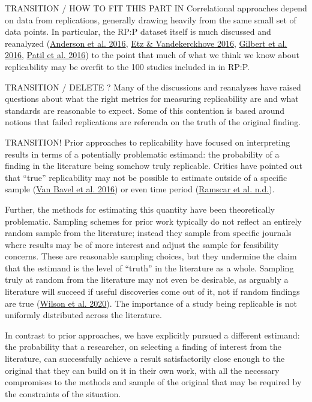\documentclass[
  english,
  a4paper,
]{article}
\begin{document}
TRANSITION / HOW TO FIT THIS PART IN Correlational approaches depend on data from replications, generally drawing heavily from the same small set of data points. In particular, the RP:P dataset itself is much discussed and reanalyzed (\protect\hyperlink{ref-anderson2016}{Anderson et al. 2016}, \protect\hyperlink{ref-etz2016}{Etz \& Vandekerckhove 2016}, \protect\hyperlink{ref-gilbert2016}{Gilbert et al. 2016}, \protect\hyperlink{ref-patil2016}{Patil et al. 2016}) to the point that much of what we think we know about replicability may be overfit to the 100 studies included in in RP:P.

TRANSITION / DELETE ? Many of the discussions and reanalyses have raised questions about what the right metrics for measuring replicability are and what standards are reasonable to expect. Some of this contention is based around notions that failed replications are referenda on the truth of the original finding.

TRANSITION! Prior approaches to replicability have focused on interpreting results in terms of a potentially problematic estimand: the probability of a finding in the literature being somehow truly replicable. Critics have pointed out that ``true'' replicability may not be possible to estimate outside of a specific sample (\protect\hyperlink{ref-vanbavel2016}{Van Bavel et al. 2016}) or even time period (\protect\hyperlink{ref-ramscar}{Ramscar et al. n.d.}).

Further, the methods for estimating this quantity have been theoretically problematic. Sampling schemes for prior work typically do not reflect an entirely random sample from the literature; instead they sample from specific journals where results may be of more interest and adjust the sample for feasibility concerns. These are reasonable sampling choices, but they undermine the claim that the estimand is the level of ``truth'' in the literature as a whole. Sampling truly at random from the literature may not even be desirable, as arguably a literature will succeed if useful discoveries come out of it, not if random findings are true (\protect\hyperlink{ref-wilson2020}{Wilson et al. 2020}). The importance of a study being replicable is not uniformly distributed across the literature.

In contrast to prior approaches, we have explicitly pursued a different estimand: the probability that a researcher, on selecting a finding of interest from the literature, can successfully achieve a result satisfactorily close enough to the original that they can build on it in their own work, with all the necessary compromises to the methods and sample of the original that may be required by the constraints of the situation.
\end{document}
